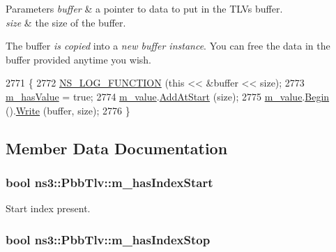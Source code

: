 \begin{DoxyParams}{Parameters}
{\em buffer} & a pointer to data to put in the T\+L\+Vs buffer. \\
\hline
{\em size} & the size of the buffer.\\
\hline
\end{DoxyParams}
The buffer {\itshape is copied} into a {\itshape new buffer instance}. You can free the data in the buffer provided anytime you wish. 
\begin{DoxyCode}
2771 \{
2772   \hyperlink{log-macros-disabled_8h_a90b90d5bad1f39cb1b64923ea94c0761}{NS\_LOG\_FUNCTION} (\textcolor{keyword}{this} << &buffer << size);
2773   \hyperlink{classns3_1_1PbbTlv_af3107c5c533dddcfd24d17cd2e3a0b73}{m\_hasValue} = \textcolor{keyword}{true};
2774   \hyperlink{classns3_1_1PbbTlv_a5ec01aeec2b0987806b1304e24db9859}{m\_value}.\hyperlink{classns3_1_1Buffer_a8abd8164c3671d3dadc98fc66fade7b1}{AddAtStart} (size);
2775   \hyperlink{classns3_1_1PbbTlv_a5ec01aeec2b0987806b1304e24db9859}{m\_value}.\hyperlink{classns3_1_1Buffer_a893d4bf50df13e730b6cd0fda91b967f}{Begin} ().\hyperlink{classns3_1_1Buffer_1_1Iterator_a087b4e6b5d038544c750c741e8932d69}{Write} (buffer, size);
2776 \}
\end{DoxyCode}


\subsection{Member Data Documentation}
\subsubsection[{\texorpdfstring{m\+\_\+has\+Index\+Start}{m_hasIndexStart}}]{\setlength{\rightskip}{0pt plus 5cm}bool ns3\+::\+Pbb\+Tlv\+::m\+\_\+has\+Index\+Start\hspace{0.3cm}{\ttfamily [private]}}\hypertarget{classns3_1_1PbbTlv_a65915c1a92534f30af37ca8ca3eb728f}{}\label{classns3_1_1PbbTlv_a65915c1a92534f30af37ca8ca3eb728f}


Start index present. 

\subsubsection[{\texorpdfstring{m\+\_\+has\+Index\+Stop}{m_hasIndexStop}}]{\setlength{\rightskip}{0pt plus 5cm}bool ns3\+::\+Pbb\+Tlv\+::m\+\_\+has\+Index\+Stop\hspace{0.3cm}{\ttfamily [private]}}\hypertarget{classns3_1_1PbbTlv_a996e0cb531098c670b1ea60cad83563b}{}\label{classns3_1_1PbbTlv_a996e0cb531098c670b1ea60cad83563b}


